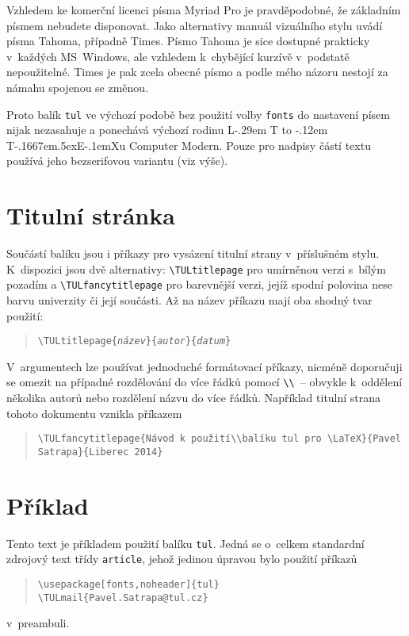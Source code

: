 \documentclass[a4paper,12pt,twoside]{article}
\makeatletter
\newcommand{\cmdfont}[1]{\texttt{\color{\tulcolor}#1}}
\newcommand{\cmd}[1]{\cmdfont{\textbackslash #1}}
\def\TeX{T\kern-.1667em\lower.5ex\hbox{E}\kern-.1emX\@}
\DeclareRobustCommand{\LaTeX}{L\kern-.29em%
        {\sbox\z@ T%
         \vbox to\ht\z@{\hbox{\check@mathfonts
                              \fontsize\sf@size\z@
                              \math@fontsfalse\selectfont
                              A}%
                        \vss}%
        }%
        \kern-.12em%
        \TeX}
\makeatother
\begin{document}
Vzhledem ke komerční licenci písma Myriad Pro je pravděpodobné, že základním
písmem nebudete disponovat. Jako alternativy manuál vizuálního stylu uvádí
písma Tahoma, případně Times. Písmo Tahoma je sice dostupné prakticky v~každých
MS~Windows, ale vzhledem k~chybějící kurzívě v~podstatě nepoužitelné. Times je
pak zcela obecné písmo a podle mého názoru nestojí za námahu spojenou se
změnou.

Proto balík \cmdfont{tul} ve výchozí podobě bez použití volby \cmdfont{fonts}
do nastavení písem nijak nezasahuje a ponechává výchozí rodinu \LaTeX u
Computer Modern. Pouze pro nadpisy částí textu používá jeho bezserifovou
variantu (viz výše).


\section{Titulní stránka}

Součástí balíku jsou i příkazy pro vysázení titulní strany v~příslušném stylu.
K~dispozici jsou dvě alternativy: \cmd{TULtitlepage} pro umírněnou verzi
s~bílým pozadím a \cmd{TULfancytitlepage} pro barevnější verzi, jejíž spodní
polovina nese barvu univerzity či její součásti. Až na název příkazu mají oba
shodný tvar použití:

\begin{quote}
\cmd{TULtitlepage\{\emph{název}\}\{\emph{autor}\}\{\emph{datum}\}}
\end{quote}

V~argumentech lze používat jednoduché formátovací příkazy, nicméně
doporučuji se omezit na případné rozdělování do více řádků pomocí
\cmd{\textbackslash}~-- obvykle k~oddělení několika autorů nebo rozdělení
názvu do více řádků. Například titulní strana tohoto dokumentu vznikla
příkazem

\begin{quote}\begin{flushleft}
\cmd{TULfancytitlepage\{Návod k~použití\textbackslash\textbackslash balíku tul
pro \textbackslash LaTeX\}\{Pavel Satrapa\}\{Liberec 2014\}}
\end{flushleft}\end{quote}


\section{Příklad}

Tento text je příkladem použití balíku \cmdfont{tul}. Jedná se o~celkem
standardní zdrojový text třídy \cmdfont{article}, jehož jedinou úpravou bylo
použití příkazů

\begin{quote}
\cmd{usepackage[fonts,noheader]\{tul\}}\\
\cmd{TULmail\{Pavel.Satrapa@tul.cz\}}
\end{quote}

v~preambuli.
\end{document}
